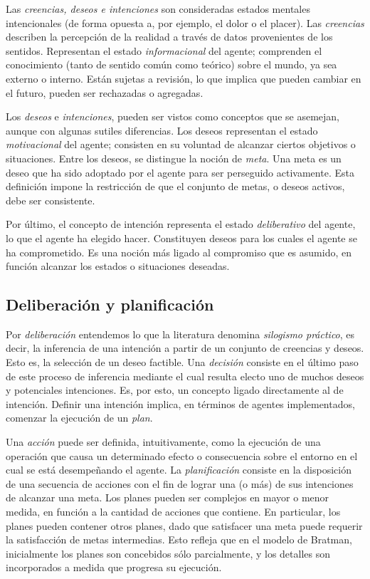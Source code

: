 Las \textit{creencias, deseos e intenciones} son consideradas estados
mentales  intencionales (de forma opuesta a, por ejemplo, el dolor o
el placer).
Las \textit{creencias}  describen la percepción de la realidad a
través de datos provenientes de  los sentidos.
Representan el estado \textit{informacional} del agente; comprenden el
conocimiento (tanto de sentido común como teórico) sobre el mundo, ya
sea  externo o interno.
Están sujetas a revisión, lo que implica que pueden  cambiar en el
futuro, pueden ser rechazadas o agregadas.


Los \textit{deseos} e \textit{intenciones}, pueden ser vistos como
conceptos que  se asemejan, aunque con algunas sutiles diferencias.
Los deseos representan el  estado \textit{motivacional} del agente;
consisten en su voluntad de alcanzar  ciertos objetivos o situaciones.
Entre los deseos, se distingue la noción de  \textit{meta}.
Una meta es un deseo que ha sido adoptado por el agente para  ser
perseguido activamente.
Esta definición impone la restricción de que el  conjunto de metas, o
deseos activos, debe ser consistente.


Por último, el concepto de intención representa el estado
\textit{deliberativo} del agente, lo que el agente ha elegido hacer.
Constituyen deseos para los cuales el agente se ha comprometido.
Es una noción más ligado al compromiso que es  asumido, en función
alcanzar los estados o situaciones deseadas.


\subsection{Deliberación y planificación}
\label{sec:deliberacion_planificacion}


Por \textit{deliberación} entendemos lo que la literatura denomina
\textit{silogismo práctico}, es decir, la inferencia de una intención
a partir de un conjunto de creencias y deseos.
Esto es, la selección de un deseo factible.
Una \textit{decisión}  consiste en el último paso de este proceso de
inferencia mediante el cual  resulta electo uno de muchos deseos y
potenciales intenciones.
Es, por esto, un concepto ligado directamente al de intención.
Definir una intención implica, en  términos de agentes implementados,
comenzar la ejecución de un \textit{plan}.


Una \textit{acción} puede ser definida, intuitivamente, como la
ejecución de una operación que causa un determinado efecto o
consecuencia sobre el entorno en el cual se está desempeñando el
agente.
La \textit{planificación} consiste  en la disposición de una secuencia
de acciones con el fin de lograr una (o más) de sus intenciones de
alcanzar una meta.
Los planes pueden ser complejos en mayor o menor medida, en función a
la cantidad de acciones que contiene.
En  particular, los planes pueden contener otros planes, dado que
satisfacer una meta puede requerir la satisfacción de metas
intermedias.
Esto refleja que en  el modelo de Bratman, inicialmente los planes son
concebidos sólo parcialmente,  y los detalles son incorporados a
medida que progresa su ejecución.